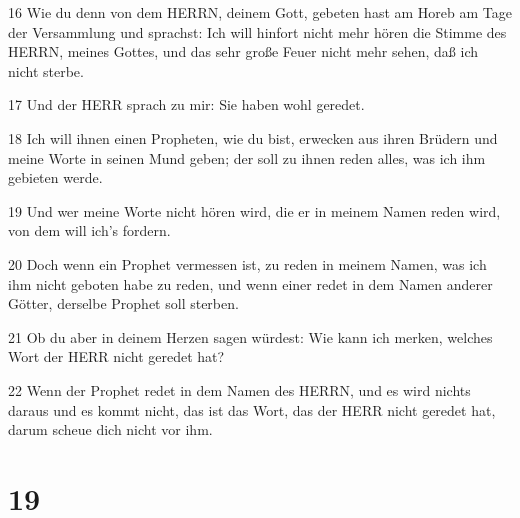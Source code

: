 \par 16 Wie du denn von dem HERRN, deinem Gott, gebeten hast am Horeb am Tage der Versammlung und sprachst: Ich will hinfort nicht mehr hören die Stimme des HERRN, meines Gottes, und das sehr große Feuer nicht mehr sehen, daß ich nicht sterbe.
\par 17 Und der HERR sprach zu mir: Sie haben wohl geredet.
\par 18 Ich will ihnen einen Propheten, wie du bist, erwecken aus ihren Brüdern und meine Worte in seinen Mund geben; der soll zu ihnen reden alles, was ich ihm gebieten werde.
\par 19 Und wer meine Worte nicht hören wird, die er in meinem Namen reden wird, von dem will ich's fordern.
\par 20 Doch wenn ein Prophet vermessen ist, zu reden in meinem Namen, was ich ihm nicht geboten habe zu reden, und wenn einer redet in dem Namen anderer Götter, derselbe Prophet soll sterben.
\par 21 Ob du aber in deinem Herzen sagen würdest: Wie kann ich merken, welches Wort der HERR nicht geredet hat?
\par 22 Wenn der Prophet redet in dem Namen des HERRN, und es wird nichts daraus und es kommt nicht, das ist das Wort, das der HERR nicht geredet hat, darum scheue dich nicht vor ihm.

\chapter{19}

